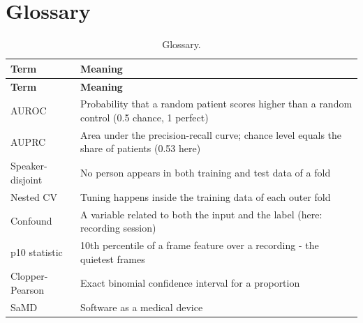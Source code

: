 \documentclass[10pt,a4paper]{article}
\begin{document}
\section{Glossary}
\begin{center}\scriptsize\renewcommand{\arraystretch}{1.12}
\begin{longtable}{p{3.2cm}p{12.8cm}}
\caption{Glossary.}\\
\toprule
\textbf{Term} & \textbf{Meaning}\\\midrule\endfirsthead
\toprule
\textbf{Term} & \textbf{Meaning}\\\midrule\endhead
\bottomrule\endfoot
AUROC & Probability that a random patient scores higher than a random control (0.5 chance, 1 perfect)\\
AUPRC & Area under the precision-recall curve; chance level equals the share of patients (0.53 here)\\
Speaker-disjoint & No person appears in both training and test data of a fold\\
Nested CV & Tuning happens inside the training data of each outer fold\\
Confound & A variable related to both the input and the label (here: recording session)\\
p10 statistic & 10th percentile of a frame feature over a recording - the quietest frames\\
Clopper-Pearson & Exact binomial confidence interval for a proportion\\
SaMD & Software as a medical device\\
\end{longtable}\end{center}
\end{document}

